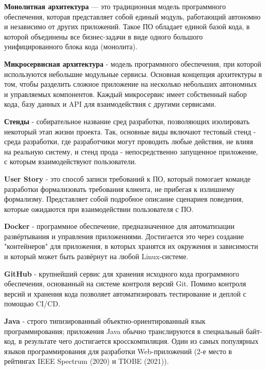 
        \textbf{Монолитная архитектура} — это традиционная модель программного обеспечения, которая представляет собой единый модуль, работающий автономно и независимо от других приложений. Такое ПО обладает единой базой кода, в которой объединены все бизнес-задачи в виде одного большого унифицированного блока кода (монолита).
    
        \textbf{Микросервисная архитектура} - модель программного обеспечения, при которой используются небольшие модульные сервисы. Основная концепция архитектуры в том, чтобы разделить сложное приложение на несколько небольших автономных и управляемых компонентов. Каждый микросервис имеет собственный набор кода, базу данных и API для взаимодействия с другими сервисами.

        \textbf{Стенды} - собирательное название сред разработки, позволяющих изолировать некоторый этап жизни проекта. Так, основные виды включают тестовый стенд - среда разработки, где разработчики могут проводить любые действия, не влияя на реальную систему, и стенд прода - непосредственно запущенное приложение, с которым взаимодействуют пользователи.

        \textbf{User Story} - это способ записи требований к ПО, который помогает команде разработки формализовать требования клиента, не прибегая к излишнему формализму. Представляет собой подробное описание сценариев поведения, которые ожидаются при взаимодействии пользователя с ПО.
 
        \textbf{Docker} -  программное обеспечение, предназначенное для автоматизации развёртывания и управления приложениями. Достигается это через создание "контейнеров" для приложения, в которых хранятся их окружения и зависимости и который может быть развёрнут на любой Linux-системе.
    
        \textbf{GitHub} - крупнейший сервис для хранения исходного кода программного обеспечения, основанный на системе контроля версий Git. Помимо контроля версий и хранения кода позволяет автоматизировать тестирование и деплой с помощью CI/CD.
    
        \textbf{Java} -  строго типизированный объектно-ориентированный язык программирования; приложения Java обычно транслируются в специальный байт-код, в результате чего достигается кросскомпиляция. Один из самых популярных языков программирования для разработки Web-приложений  (2-е место в рейтингах IEEE Spectrum (2020) и TIOBE (2021)).
    
